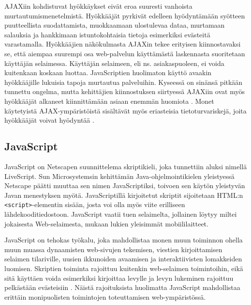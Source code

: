 AJAXiin kohdistuvat hyökkäykset eivät eroa suuresti vanhoista murtautumismenetelmistä. Hyökkääjät pyrkivät edelleen hyödyntämään syötteen puutteellista suodattamista, muokkaamaan 
ulostulevaa dataa, murtamaan salauksia ja hankkimaan istuntokohtaisia tietoja esimerkiksi evästeitä varastamalla. Hyökkääjien näkökulmasta AJAXin tekee erityisen kiinnostavaksi se,
että aiempaa suurempi osa web-palvelun käyttämästä laskennasta suoritetaan käyttäjän selaimessa. Käyttäjän selaimeen, eli ns. asiakaspuoleen, ei voida kuitenkaan koskaan luottaa.
JavaScriptien huolimaton käyttö avaakin hyökkääjille lukuisia tapoja murtautua palveluihin. Kyseessä on sinänsä pitkään tunnettu ongelma, mutta kehittäjien kiinnostuksen siirtyessä 
AJAXiin ovat myös hyökkääjät alkaneet kiinnittämään asiaan enemmän huomiota \cite{AJAX}. Monet käytetyistä AJAX-ympäristöistä sisältävät myös eriasteisia tietoturvariskejä, joita 
hyökkääjät voivat hyödyntää \cite{JSH}.

\subsection{JavaScript}

JavaScript on Netscapen suunnittelema skriptikieli, joka tunnettiin aluksi nimellä LiveScript. Sun Microsystemsin kehittämän Java-ohjelmointikielen yleistyessä Netscape päätti muuttaa
sen nimen JavaScriptiksi, toivoen sen käytön yleistyvän Javan menestyksen myötä. JavaScriptillä kirjoitetut skriptit sijoitetaan HTML:n \texttt{<script>}-elementin sisään, josta voi 
olla myös viite erilliseen lähdekooditiedostoon. JavaScript vaatii tuen selaimelta, jollainen löytyy miltei jokaisesta Web-\-selaimesta, mukaan lukien yleisimmät mobiililaitteet.

JavaScript on tehokas työkalu, joka mahdollistaa monen muun toiminnon ohella muun muassa dynaamisten web-sivujen tekemisen, viestien kirjoittamisen selaimen tilariville, uusien ikkunoiden
avaamisen ja interaktiivisten lomakkeiden luomisen. Skriptien toiminta rajoittuu kuitenkin web-selaimen toimintoihin, eikä sitä käyttäen voida esimerkiksi kirjoittaa levylle ja levyn 
lukeminen rajoittuu pelkästään evästeisiin \cite{JavaScript}. Näistä rajoituksista huolimatta JavaScript mahdollistaa erittäin monipuolisten toimintojen toteuttamisen web-ympäristössä.

